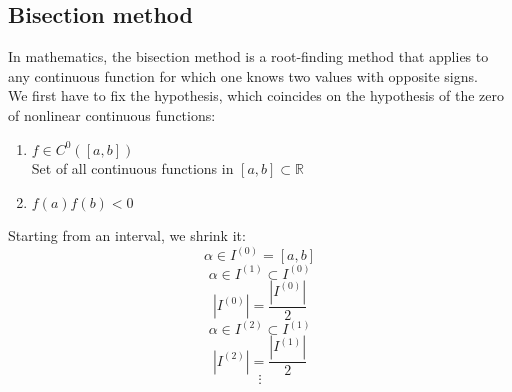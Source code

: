 \subsection{Bisection method}
In mathematics, the bisection method is a root-finding method that applies to any continuous function for which one knows two values with opposite signs.\\
We first have to fix the hypothesis, which coincides on the hypothesis of the zero of nonlinear continuous functions:
\begin{enumerate}
    \item $f\in C^0([a,b])$\\
    Set of all continuous functions in $[a,b]\subset\mathbb{R}$
    \item $f(a)f(b)<0$\\
    \begin{figure}[!ht]
        \centering
        \qquad
        \captionsetup{justification=centering}
    \end{figure}
\end{enumerate}

Starting from an interval, we shrink it:
$$
\alpha\in I^{(0)}=[a,b]$$
$$
\alpha\in I^{(1)}\subset I^{(0)}$$
$$
|I^{(0)}|=\frac{|I^{(0)}|}{2}$$
$$
\alpha\in I^{(2)}\subset I^{(1)}$$
$$
|I^{(2)}|=\frac{|I^{(1)}|}{2}$$
$$
\vdots
$$

